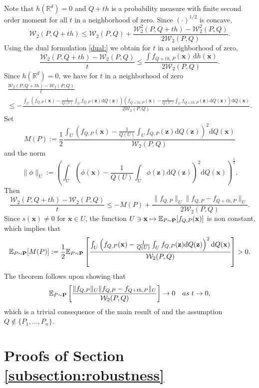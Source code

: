 \documentclass{imsart}
\numberwithin{equation}{section}
\def\R{\mathbb{R}}
\def\E{\mathbb{E}}
\def\z{\mathbf{z}}
\def\x{\mathbf{x}}
\def\E{\mathbb E}
\def\x{\mathbf x}
\def\z{\mathbf z}
\begin{document}
Note that $h(\R^d)=0$ and $Q+t h$ is a probability measure with  finite second order moment for all $t$ in a neighborhood of zero. Since $(\cdot)^{1/2}$ is concave, 
$$  \mathcal{W}_2(P,Q+th)\leq  \mathcal{W}_2(P,Q) + \frac{\mathcal{W}_2^2(P,Q+th)-\mathcal{W}_2^2(P,Q)}{2\mathcal{W}_2(P,Q)}.  $$
Using the dual formulation \eqref{dual:} we obtain for $t$ in a neighborhood of zero,
$$  \frac{\mathcal{W}_2(P,Q+th)-\mathcal{W}_2(P,Q)}{t}\leq    \frac{\int f_{Q+th,P}(\x) \, \mathrm{d}h(\x)}{2\mathcal{W}_2(P,Q)}.  $$
Since $h(\R^d)=0$, we have for $t$ in a neighborhood of zero
\begin{multline*}
	\frac{\mathcal{W}_2(P,Q+th)-\mathcal{W}_2(P,Q)}{t}\\
	\leq    -\frac{ \int_U \left( f_{Q,P}(\x)-\frac{1}{Q(U)} \int_U f_{Q,P}(\z) \mathrm{d}Q(\z) \right) \left(f_{Q+th,P}(\x)-\frac{1}{Q(U)} \int_U f_{Q+th,P}(\z) \mathrm{d}Q(\z)\right) \mathrm{d}Q(\x) }{2\mathcal{W}_2(P,Q)}.   
\end{multline*}
Set 
$$ M(P):=\frac{1}{2}\frac{\int_U \left(f_{Q,P}(\x)-\frac{1}{Q(U)}\int_U f_{Q,P}(\z) \mathrm{d}Q(\z) \right)^2 \mathrm{d}Q(\x) }{\mathcal{W}_2(P,Q)}$$
and the norm 
$$ \|\phi\|_{U}:= \left(\int_U \left(\phi(\x)-\frac{1}{Q(U)}\int_U \phi(\z) \mathrm{d}Q(\z)\right)^2 \mathrm{d}Q(\x)\right)^{\frac{1}{2}}. $$
Then 
\[\frac{\mathcal{W}_2(P,Q+th)-\mathcal{W}_2(P,Q)}{t}\leq    - M(P)+\frac{ \| f_{Q,P}\|_U \| f_{Q,P}-f_{Q+th,P}\|_U }{2\mathcal{W}_2(P,Q)}.\]
Since $s(\x)\neq 0$ for $\x \in U$, the function $U\ni \x\mapsto \E_{P \sim {\bf P}}[f_{Q,P}(\x)]$ is non constant, which implies that  
$$  \E_{P\sim {\bf P}}[M(P)]:=\frac{1}{2}\E_{P\sim {\bf P}}\left[\frac{\int_U \left(f_{Q,P}(\x)-\frac{1}{Q(U)} \int_U f_{Q,P}(\z) \mathrm{d}Q(\z) \right)^2 \mathrm{d}Q(\x) }{\mathcal{W}_2(P,Q)}\right]>0.  $$
The theorem follows upon showing that 
\begin{equation}
	\E_{P\sim {\bf P}}\left[ \frac{ \| f_{Q,P}\|_U \| f_{Q,P}-f_{Q+th,P}\|_U }{\mathcal{W}_2(P,Q)} \right]\to 0\quad {\rm as} \ t\to 0,
\end{equation}
which is a trivial consequence of the main result of \cite{Segers2022GraphicalAU} and the assumption $Q \not \in \{ P_1 , \ldots , P_n \}$. 

\section{Proofs of Section \ref{subsection:robustness}}
\end{document}
